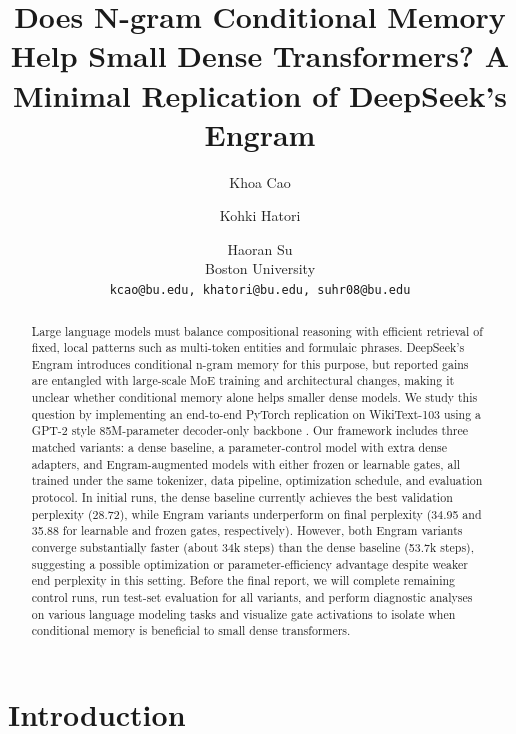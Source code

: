 \documentclass[11pt]{article}
\title{Does N-gram Conditional Memory Help Small Dense Transformers?
A Minimal Replication of DeepSeek's Engram}
\author{
	Khoa Cao \and Kohki Hatori \and Haoran Su \\
    Boston University \\
	\texttt{kcao@bu.edu, khatori@bu.edu, suhr08@bu.edu}
}
\begin{document}
\maketitle


\begin{abstract}
Large language models must balance compositional reasoning with efficient retrieval of fixed, local patterns such as multi-token entities and formulaic phrases. DeepSeek's Engram introduces conditional n-gram memory for this purpose, but reported gains are entangled with large-scale MoE training and architectural changes, making it unclear whether conditional memory alone helps smaller dense models. 
We study this question by implementing an end-to-end PyTorch replication on WikiText-103 using a GPT-2 style 85M-parameter decoder-only backbone \cite{radford2019language}. Our framework includes three matched variants: a dense baseline, a parameter-control model with extra dense adapters, and Engram-augmented models with either frozen or learnable gates, all trained under the same tokenizer, data pipeline, optimization schedule, and evaluation protocol. 
In initial runs, the dense baseline currently achieves the best validation perplexity (28.72), while Engram variants underperform on final perplexity (34.95 and 35.88 for learnable and frozen gates, respectively). However, both Engram variants converge substantially faster (about 34k steps) than the dense baseline (53.7k steps), suggesting a possible optimization or parameter-efficiency advantage despite weaker end perplexity in this setting. 
Before the final report, we will complete remaining control runs, run test-set evaluation for all variants, and perform diagnostic analyses on various language modeling tasks and visualize gate activations to isolate when conditional memory is beneficial to small dense transformers.
\end{abstract}

\section{Introduction}
\end{document}

